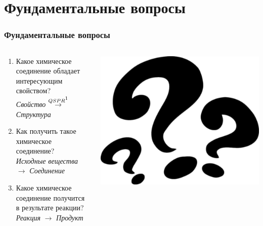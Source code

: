 \section{Фундаментальные вопросы}
\begin{frame}
   \frametitle{Фундаментальные вопросы}
   \begin{columns}
      \begin{column}{0.6\textwidth}
      \begin{enumerate}
         \item Какое {\color{red}химическое соединение} обладает интересующим свойством? \\
            \emph{Свойство} $ \overset{QSPR\footnotemark}{\rightarrow} $ \emph{Структура}
         \item Как получить такое {\color{red}химическое соединение}? \\
            \emph{Исходные вещества} $ \rightarrow $ \emph{Соединение}
         \item Какое {\color{red}химическое соединение} получится в результате реакции? \\
            \emph{Реакция} $ \rightarrow $ \emph{Продукт}
      \end{enumerate}
      \end{column}
      \begin{column}{0.4\textwidth}
         \includegraphics[scale=0.65]{images/question-marks2.png}
      \end{column}
   \end{columns}


\end{frame}

